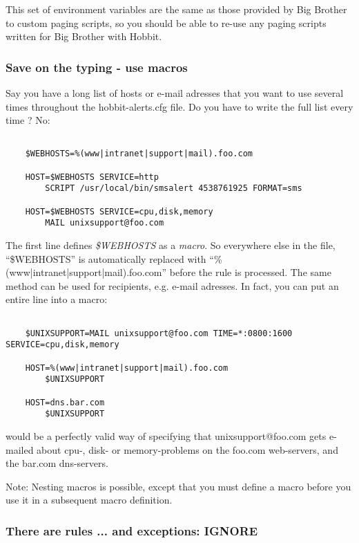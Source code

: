  This set of environment variables are the same as those provided by Big Brother to custom paging scripts, so you should be able to re-use any paging scripts written for Big Brother with Hobbit.
\subsubsection{Save on the typing - use macros}


 Say you have a long list of hosts or e-mail adresses that you want to use several times throughout the hobbit-alerts.cfg file. Do you have to write the full list every time ? No: 
\begin{verbatim}

	$WEBHOSTS=%(www|intranet|support|mail).foo.com 
	
	HOST=$WEBHOSTS SERVICE=http
		SCRIPT /usr/local/bin/smsalert 4538761925 FORMAT=sms

	HOST=$WEBHOSTS SERVICE=cpu,disk,memory
		MAIL unixsupport@foo.com

\end{verbatim}

 The first line defines \emph{\$WEBHOSTS} as a \emph{macro}. So everywhere else in the file, ``\$WEBHOSTS'' is automatically replaced with ``\%(www|intranet|support|mail).foo.com'' before the rule is processed. The same method can be used for recipients, e.g. e-mail adresses. In fact, you can put an entire line into a macro:

\begin{verbatim}

	$UNIXSUPPORT=MAIL unixsupport@foo.com TIME=*:0800:1600 SERVICE=cpu,disk,memory

	HOST=%(www|intranet|support|mail).foo.com 
		$UNIXSUPPORT

	HOST=dns.bar.com
		$UNIXSUPPORT

\end{verbatim}



 would be a perfectly valid way of specifying that unixsupport@foo.com gets e-mailed about cpu-, disk- or memory-problems on the foo.com web-servers, and the bar.com dns-servers.


 Note: Nesting macros is possible, except that you must define a macro before you use it in a subsequent macro definition.
\subsubsection{There are rules ... and exceptions: IGNORE}



